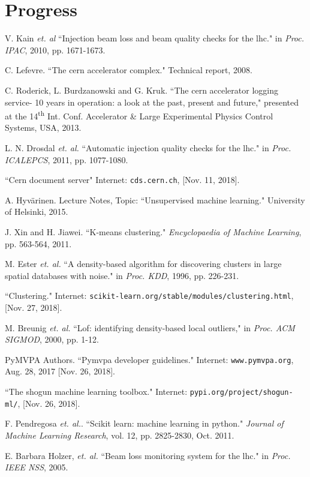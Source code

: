\documentclass[12pt, twoside]{report}
\begin{document}
	\section{Progress}
	
	\begin{thebibliography}{14}
		V. Kain \textit{et. al} ``Injection beam loss and beam quality checks for the lhc." in \textit{Proc. IPAC}, 2010, pp. 1671-1673.
		
		C. Lefevre. ``The cern accelerator complex." Technical report, 2008.
		
		C. Roderick, L. Burdzanowski and G. Kruk. ``The cern accelerator logging service- 10 years in operation: a look at the past, present and future," presented at the 14\textsuperscript{th} Int. Conf. Accelerator \& Large Experimental Physics Control Systems, USA, 2013.
		
		L. N. Drosdal \textit{et. al.} ``Automatic injection quality checks for the lhc." in \textit{Proc. ICALEPCS}, 2011, pp. 1077-1080.
		
		``Cern document server" Internet: \texttt{cds.cern.ch}, [Nov. 11, 2018].
		
		A. Hyv{\"a}rinen. Lecture Notes, Topic: ``Unsupervised machine learning." University of Helsinki, 2015.
		
		J. Xin and H. Jiawei. ``K-means clustering." \textit{Encyclopaedia of Machine Learning}, pp. 563-564, 2011.
		
		M. Ester \textit{et. al.} ``A density-based algorithm for discovering clusters in large spatial databases with noise." in \textit{Proc. KDD}, 1996, pp. 226-231.
		
		``Clustering." Internet: \texttt{scikit-learn.org/stable/modules/clustering.html}, [Nov. 27, 2018].
		
		M. Breunig \textit{et. al.} ``Lof: identifying density-based local outliers," in \textit{Proc. ACM SIGMOD}, 2000, pp. 1-12.
		
		PyMVPA Authors. ``Pymvpa developer guidelines." Internet: \texttt{www.pymvpa.org}, Aug. 28, 2017 [Nov. 26, 2018].
		
		``The shogun machine learning toolbox." Internet: \texttt{pypi.org/project/shogun-ml/}, [Nov. 26, 2018].
		
		F. Pendregosa \textit{et. al.}. ``Scikit learn: machine learning in python." \textit{Journal of Machine Learning Research}, vol. 12, pp. 2825-2830, Oct. 2011.
		
		E. Barbara Holzer, \textit{et. al.} ``Beam loss monitoring system for the lhc." in \textit{Proc. IEEE NSS}, 2005. 
	\end{thebibliography}
\end{document}
